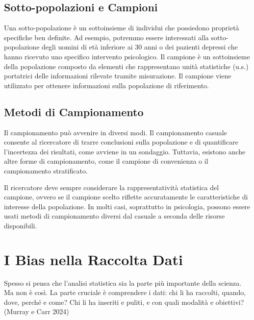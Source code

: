 \documentclass[
  letterpaper,
  krantz2]{{[}./krantz{]}}
\begin{document}
\subsection{Sotto-popolazioni e
Campioni}\label{sotto-popolazioni-e-campioni}

Una sotto-popolazione è un sottoinsieme di individui che possiedono
proprietà specifiche ben definite. Ad esempio, potremmo essere
interessati alla sotto-popolazione degli uomini di età inferiore ai 30
anni o dei pazienti depressi che hanno ricevuto uno specifico intervento
psicologico. Il campione è un sottoinsieme della popolazione composto da
elementi che rappresentano unità statistiche (u.s.) portatrici delle
informazioni rilevate tramite misurazione. Il campione viene utilizzato
per ottenere informazioni sulla popolazione di riferimento.

\subsection{Metodi di Campionamento}\label{metodi-di-campionamento}

Il campionamento può avvenire in diversi modi. Il campionamento casuale
consente al ricercatore di trarre conclusioni sulla popolazione e di
quantificare l'incertezza dei risultati, come avviene in un sondaggio.
Tuttavia, esistono anche altre forme di campionamento, come il campione
di convenienza o il campionamento stratificato.

Il ricercatore deve sempre considerare la rappresentatività statistica
del campione, ovvero se il campione scelto riflette accuratamente le
caratteristiche di interesse della popolazione. In molti casi,
soprattutto in psicologia, possono essere usati metodi di campionamento
diversi dal casuale a seconda delle risorse disponibili.

\section{I Bias nella Raccolta Dati}\label{i-bias-nella-raccolta-dati}

Spesso si pensa che l'analisi statistica sia la parte più importante
della scienza. Ma non è così. La parte cruciale è comprendere i dati:
chi li ha raccolti, quando, dove, perché e come? Chi li ha inseriti e
puliti, e con quali modalità e obiettivi? (Murray e Carr 2024)
\end{document}
